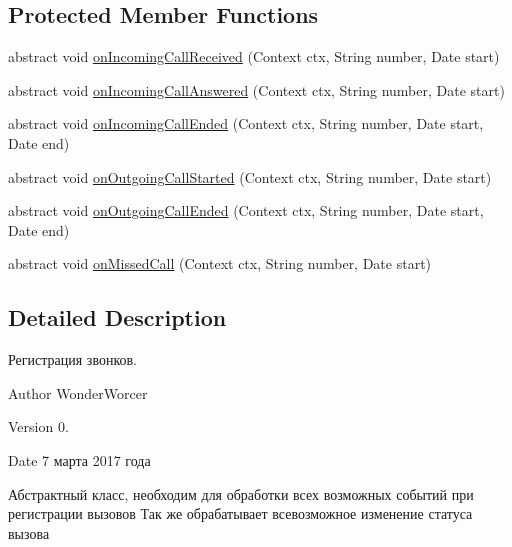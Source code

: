 \subsection*{Protected Member Functions}
\begin{DoxyCompactItemize}
\item 
abstract void \hyperlink{classcom_1_1aykuttasil_1_1callrecord_1_1receiver_1_1_phone_call_receiver_ae5652596a226051d4c9c17c60a33e0e9}{on\+Incoming\+Call\+Received} (Context ctx, String number, Date start)
\item 
abstract void \hyperlink{classcom_1_1aykuttasil_1_1callrecord_1_1receiver_1_1_phone_call_receiver_acbc8b7f309fb858c04d4655446382daa}{on\+Incoming\+Call\+Answered} (Context ctx, String number, Date start)
\item 
abstract void \hyperlink{classcom_1_1aykuttasil_1_1callrecord_1_1receiver_1_1_phone_call_receiver_a3a8498e884fcd5f0d9f8b1b7430b1205}{on\+Incoming\+Call\+Ended} (Context ctx, String number, Date start, Date end)
\item 
abstract void \hyperlink{classcom_1_1aykuttasil_1_1callrecord_1_1receiver_1_1_phone_call_receiver_afd2d9ccabe85671cca9b3ef0077e4d92}{on\+Outgoing\+Call\+Started} (Context ctx, String number, Date start)
\item 
abstract void \hyperlink{classcom_1_1aykuttasil_1_1callrecord_1_1receiver_1_1_phone_call_receiver_ac59381a8d49e6b7c0e99e15674c0cef3}{on\+Outgoing\+Call\+Ended} (Context ctx, String number, Date start, Date end)
\item 
abstract void \hyperlink{classcom_1_1aykuttasil_1_1callrecord_1_1receiver_1_1_phone_call_receiver_a13b659e0a07a2334da587820ae3e5996}{on\+Missed\+Call} (Context ctx, String number, Date start)
\end{DoxyCompactItemize}


\subsection{Detailed Description}
Регистрация звонков. 

\begin{DoxyAuthor}{Author}
Wonder\+Worcer 
\end{DoxyAuthor}
\begin{DoxyVersion}{Version}
0. 
\end{DoxyVersion}
\begin{DoxyDate}{Date}
7 марта 2017 года
\end{DoxyDate}
Абстрактный класс, необходим для обработки всех возможных событий при регистрации вызовов Так же обрабатывает всевозможное изменение статуса вызова 

